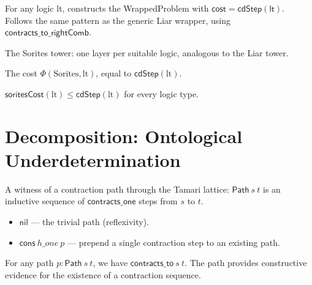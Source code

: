 \begin{definition}
\label{def:sorites_wrapper}
\leanok
{}
For any logic \textsf{lt}, constructs the \textsf{WrappedProblem} with
$\textsf{cost} = \textsf{cdStep}(\textsf{lt})$. Follows the same pattern
as the generic Liar wrapper, using $\mathsf{contracts\_to\_rightComb}$.
\end{definition}

\begin{definition}
\label{def:sorites_tower}
\leanok
{}
The Sorites tower: one layer per suitable logic, analogous to the Liar tower.
\end{definition}

\begin{definition}
\label{def:sorites_cost}
\leanok
{}
The cost $\Phi(\text{Sorites}, \text{lt})$, equal to $\textsf{cdStep}(\text{lt})$.
\end{definition}

\begin{theorem}
\label{thm:sorites_cost_bound}
\leanok
{}
$\textsf{soritesCost}(\text{lt}) \le \textsf{cdStep}(\text{lt})$ for every logic type.
\end{theorem}

\section{Decomposition: Ontological Underdetermination}

\begin{definition}[Path]
\label{def:path}
\leanok
{}
A witness of a contraction path through the Tamari lattice:
$\mathsf{Path}\ s\ t$ is an inductive sequence of
$\mathsf{contracts\_one}$ steps from $s$ to $t$.
\begin{itemize}
  \item $\mathsf{nil}$ --- the trivial path (reflexivity).
  \item $\mathsf{cons}\ h\_one\ p$ --- prepend a single contraction step to an existing path.
\end{itemize}
\end{definition}

\begin{theorem}
\label{thm:path_soundness}
\leanok
{}
For any path $p : \mathsf{Path}\ s\ t$, we have $\mathsf{contracts\_to}\ s\ t$.
The path provides constructive evidence for the existence of a contraction sequence.
\end{theorem}


